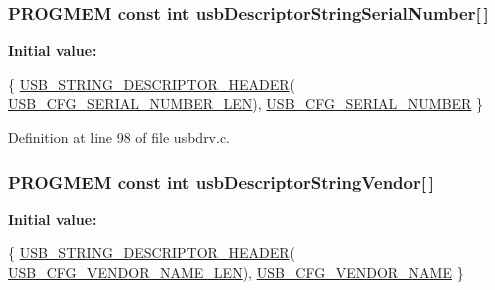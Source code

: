 \hypertarget{mhvlib-_vusb-_console_2vusb_2usbdrv_8c_a97aa1ed300e711b6eabb5cef561313a3}{
\subsubsection[{usb\-Descriptor\-String\-Serial\-Number}]{\setlength{\rightskip}{0pt plus 5cm}P\-R\-O\-G\-M\-E\-M const int usb\-Descriptor\-String\-Serial\-Number\mbox{[}$\,$\mbox{]}}}\label{mhvlib-_vusb-_console_2vusb_2usbdrv_8c_a97aa1ed300e711b6eabb5cef561313a3}
{\bfseries Initial value\-:}
\begin{DoxyCode}
 \{
    \hyperlink{mhvlib-_vusb-_keyboard_2vusb_2usbdrv_8h_ad94ebd3045d80d1e2ab32c22be4ff96e}{USB\_STRING\_DESCRIPTOR\_HEADER}(
      \hyperlink{mhvlib-_vusb-_keyboard_2vusb_2usbconfig_8h_a641423b56d832e5d8aff852390591aa0}{USB\_CFG\_SERIAL\_NUMBER\_LEN}),
    \hyperlink{mhvlib-_vusb-_keyboard_2vusb_2usbconfig_8h_a854f9931a43692546ac669ad8b7c4a98}{USB\_CFG\_SERIAL\_NUMBER}
\}
\end{DoxyCode}


Definition at line 98 of file usbdrv.\-c.

\hypertarget{mhvlib-_vusb-_console_2vusb_2usbdrv_8c_aa92b0dfd57d302ff023bfb7ed868c2a1}{
\subsubsection[{usb\-Descriptor\-String\-Vendor}]{\setlength{\rightskip}{0pt plus 5cm}P\-R\-O\-G\-M\-E\-M const int usb\-Descriptor\-String\-Vendor\mbox{[}$\,$\mbox{]}}}\label{mhvlib-_vusb-_console_2vusb_2usbdrv_8c_aa92b0dfd57d302ff023bfb7ed868c2a1}
{\bfseries Initial value\-:}
\begin{DoxyCode}
 \{
    \hyperlink{mhvlib-_vusb-_keyboard_2vusb_2usbdrv_8h_ad94ebd3045d80d1e2ab32c22be4ff96e}{USB\_STRING\_DESCRIPTOR\_HEADER}(
      \hyperlink{mhvlib-_vusb-_keyboard_2vusb_2usbconfig-prototype_8h_a3085d820d9dc6e939737a3f1b9a457d7}{USB\_CFG\_VENDOR\_NAME\_LEN}),
    \hyperlink{mhvlib-_vusb-_keyboard_2vusb_2usbconfig-prototype_8h_a25a2baf5c8feb0982a47050423add0ec}{USB\_CFG\_VENDOR\_NAME}
\}
\end{DoxyCode}


